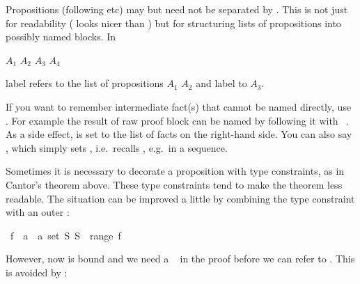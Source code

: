 \begin{isabellebody}
\begin{isamarkuptext}
\end{isamarkuptext}%
\isamarkuptrue%
%
\isamarkuptrue%
%
\begin{isamarkuptext}%
Propositions (following  etc) may but need not be
separated by . This is not just for readability
(    looks nicer than
  ) but for structuring lists of propositions
into possibly named blocks. In
\begin{center}
  $A_1$ $A_2$   $A_3$
 $A_4$
\end{center}
label  refers to the list of propositions $A_1$ $A_2$ and
label  to $A_3$.%
\end{isamarkuptext}%
\isamarkuptrue%
%
\isamarkuptrue%
%
\begin{isamarkuptext}%
If you want to remember intermediate fact(s) that cannot be
named directly, use . For example the result of raw
proof block can be named by following it with
~.  As a side effect,
 is set to the list of facts on the right-hand side. You
can also say , which simply sets ,
i.e.\ recalls , e.g.\ in a  sequence.%
\end{isamarkuptext}%
\isamarkuptrue%
%
\isamarkuptrue%
%
\begin{isamarkuptext}%
Sometimes it is necessary to decorate a proposition with type
constraints, as in Cantor's theorem above. These type constraints tend
to make the theorem less readable. The situation can be improved a
little by combining the type constraint with an outer \isa{{\isasymAnd}}:%
\end{isamarkuptext}%
\isamarkuptrue%
\ {\isachardoublequote}{\isasymAnd}f\ {\isacharcolon}{\isacharcolon}\ {\isacharprime}a\ {\isasymRightarrow}\ {\isacharprime}a\ set{\isachardot}\ {\isasymexists}S{\isachardot}\ S\ {\isasymnotin}\ range\ f{\isachardoublequote}\isamarkupfalse%
\isamarkupfalse%
%
\begin{isamarkuptext}%
\noindent However, now  is bound and we need a
~ in the proof before we can refer to .
This is avoided by :%
\end{isamarkuptext}%

\end{isabellebody}
